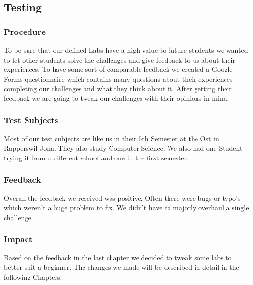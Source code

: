\subsection{Testing}
\subsubsection{Procedure}
To be sure that our defined Labs have a high value to future students we wanted to let other students solve the challenges and give feedback to us about their experiences. To have some sort of comparable feedback we created a Google Forms questionnaire which contains many questions about their experiences completing our challenges and what they think about it. After getting their feedback we are going to tweak our challenges with their opinions in mind.

\subsubsection{Test Subjects}
Most of our test subjects are like us in their 5th Semester at the Ost in Rapperswil-Jona. They also study Computer Science. We also had one Student trying it from a different school and one in the first semester.

\subsubsection{Feedback}
Overall the feedback we received was positive. Often there were bugs or typo's which weren't a huge problem to fix. We didn't have to majorly overhaul a single challenge.

\subsubsection{Impact}
Based on the feedback in the last chapter we decided to tweak some labs to better suit a beginner. The changes we made will be described in detail in the following Chapters.